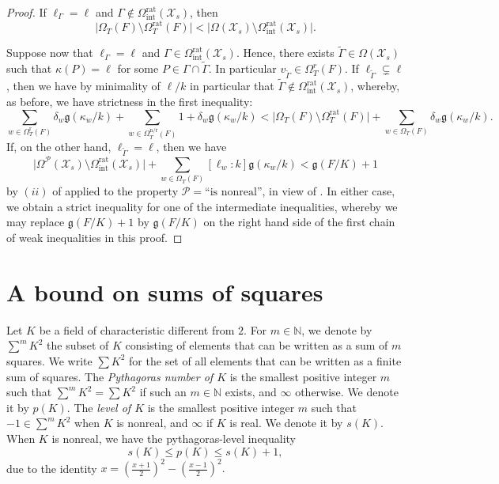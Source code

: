 \documentclass[a4paper,12pt,reqno]{amsart}
\newcommand\mc\mathcal
\newcommand{\wt}{\widetilde}
\theoremstyle{definition}
\numberwithin{equation}{thm}
\renewcommand{\leq}{\leqslant}
\begin{document}
\begin{proof}
If $\ell_\Gamma = \ell$ and $\Gamma \notin \Omega^\mathrm{rat}_{\mathrm{int}}(\mc{X}_s)$, then $$\vert \Omega_T(F) \setminus \Omega^\mathrm{rat}_T(F) \vert < \vert \Omega(\mc{X}_s) \setminus \Omega^\mathrm{rat}_{\mathrm{int}}(\mc{X}_s) \vert.$$

Suppose now that $\ell_\Gamma = \ell$ and $\Gamma \in \Omega^\mathrm{rat}_{\mathrm{int}}(\mc{X}_s)$. Hence, there exists $\widetilde{\Gamma} \in \Omega(\mc{X}_s)$ such that 
$\kappa(P) =\ell$ for some $P \in \Gamma \cap \widetilde{\Gamma}$. In particular $v_{\wt{\Gamma}} \in \Omega^{r}_T(F)$. If $\ell_{\wt{\Gamma}} \subsetneq \ell$, then we have by  minimality of $\ell/k$ in particular that 
  $\widetilde{\Gamma} \notin\Omega^\mathrm{rat}_{\mathrm{int}} (\mc{X}_s)$, whereby, as before, we have strictness in the first inequality: $$\sum_{w \in \Omega^{\text{r}}_T(F)}\!\! \delta_w\mathfrak{g}(\kappa_w/k)+ \sum_{w \in \Omega^{\text{n/r}}_T(F)}\!\!\! 1+ \delta_w\mathfrak{g}(\kappa_w/k) < \vert \Omega_{T}(F) \setminus \Omega^{\mathrm{rat}}_T(F) \vert + \sum_{w \in \Omega_T(F)} \delta_w \mathfrak{g}(\kappa_w/k).$$
If, on the other hand, $\ell_{\wt{\Gamma}} = \ell$, then 
we have $$\vert \Omega^{\mathcal{P}}(\mc{X}_s) \setminus \Omega^\mathrm{rat}_{\mathrm{int}}(\mc{X}_s) \vert + \sum_{w \in \Omega_T(F)} \!\! [\ell_w:k] \mathfrak{g}(\kappa_w/k) < \mathfrak{g}(F/K) + 1$$
 by $(ii)$ of  applied to the property $\mathcal{P}=\text{``is nonreal''}$, in view of .
 In either case, we obtain a strict inequality for one of the intermediate inequalities, whereby we may replace $\mathfrak{g}(F/K) + 1$ by $\mathfrak{g}(F/K)$ on the right hand side of the first chain of weak inequalities in this proof.
\end{proof}



\section{A bound on sums of squares}\label{sumsofsquaressection}

Let $K$ be a field of characteristic different from $2$. For $m \in \mathbb{N}$, we denote by
 $\sum^m K^2$ the subset of $K$ consisting of elements that can be written as a sum of $m$ squares. We write $\sum K^2$ for the set of all elements that can be written as a finite sum of squares. The
\textit{Pythagoras number of $K$} is the smallest positive integer $m$ such that $\sum^m K^2 = \sum K^2$ if such an $m \in \mathbb{N}$ exists, and $\infty$ otherwise. We denote it by $p(K)$. The \textit{level of $K$} is the smallest positive integer $m$ such that $-1 \in  \sum^m K^2$ when $K$ is nonreal, and $\infty$ if $K$ is real. We denote it by $s(K)$. When $K$ is nonreal, we have the pythagoras-level inequality 
$$  s(K)\leq p(K)\leq s(K)+1, $$
due to the identity $x=(\frac{x+1}{2})^2-(\frac{x-1}{2})^2.$ 
\end{document}
